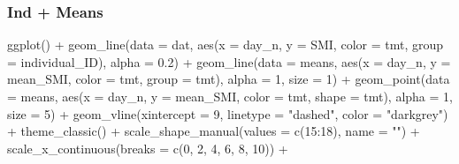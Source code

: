 \documentclass[
]{article}
\newenvironment{Shaded}{\begin{snugshade}}{\end{snugshade}}
\newcommand{\AttributeTok}[1]{\textcolor[rgb]{0.77,0.63,0.00}{#1}}
\newcommand{\DecValTok}[1]{\textcolor[rgb]{0.00,0.00,0.81}{#1}}
\newcommand{\FloatTok}[1]{\textcolor[rgb]{0.00,0.00,0.81}{#1}}
\newcommand{\FunctionTok}[1]{\textcolor[rgb]{0.00,0.00,0.00}{#1}}
\newcommand{\NormalTok}[1]{#1}
\newcommand{\SpecialCharTok}[1]{\textcolor[rgb]{0.00,0.00,0.00}{#1}}
\newcommand{\StringTok}[1]{\textcolor[rgb]{0.31,0.60,0.02}{#1}}
\begin{document}
\hypertarget{ind-means}{%
\subsubsection{Ind + Means}\label{ind-means}}

\begin{Shaded}
\begin{Highlighting}[]
\FunctionTok{ggplot}\NormalTok{() }\SpecialCharTok{+} 
  \FunctionTok{geom\_line}\NormalTok{(}\AttributeTok{data =}\NormalTok{ dat,}
            \FunctionTok{aes}\NormalTok{(}\AttributeTok{x =}\NormalTok{ day\_n,}
                \AttributeTok{y =}\NormalTok{ SMI, }
                \AttributeTok{color =}\NormalTok{ tmt,}
                \AttributeTok{group =}\NormalTok{ individual\_ID),}
            \AttributeTok{alpha =} \FloatTok{0.2}\NormalTok{) }\SpecialCharTok{+}
  \FunctionTok{geom\_line}\NormalTok{(}\AttributeTok{data =}\NormalTok{ means,}
            \FunctionTok{aes}\NormalTok{(}\AttributeTok{x =}\NormalTok{ day\_n,}
                \AttributeTok{y =}\NormalTok{ mean\_SMI, }
                \AttributeTok{color =}\NormalTok{ tmt,}
                \AttributeTok{group =}\NormalTok{ tmt),}
            \AttributeTok{alpha =} \DecValTok{1}\NormalTok{, }
            \AttributeTok{size =} \DecValTok{1}\NormalTok{) }\SpecialCharTok{+}
  \FunctionTok{geom\_point}\NormalTok{(}\AttributeTok{data =}\NormalTok{ means,}
            \FunctionTok{aes}\NormalTok{(}\AttributeTok{x =}\NormalTok{ day\_n,}
                \AttributeTok{y =}\NormalTok{ mean\_SMI, }
                \AttributeTok{color =}\NormalTok{ tmt,}
                \AttributeTok{shape =}\NormalTok{ tmt),}
            \AttributeTok{alpha =} \DecValTok{1}\NormalTok{, }
            \AttributeTok{size =} \DecValTok{5}\NormalTok{) }\SpecialCharTok{+}
  \FunctionTok{geom\_vline}\NormalTok{(}\AttributeTok{xintercept =} \DecValTok{9}\NormalTok{,}
             \AttributeTok{linetype =} \StringTok{"dashed"}\NormalTok{,}
             \AttributeTok{color =} \StringTok{"darkgrey"}\NormalTok{) }\SpecialCharTok{+}
  \FunctionTok{theme\_classic}\NormalTok{() }\SpecialCharTok{+} 
  \FunctionTok{scale\_shape\_manual}\NormalTok{(}\AttributeTok{values =} \FunctionTok{c}\NormalTok{(}\DecValTok{15}\SpecialCharTok{:}\DecValTok{18}\NormalTok{), }\AttributeTok{name =} \StringTok{""}\NormalTok{) }\SpecialCharTok{+}
  \FunctionTok{scale\_x\_continuous}\NormalTok{(}\AttributeTok{breaks =} \FunctionTok{c}\NormalTok{(}\DecValTok{0}\NormalTok{, }\DecValTok{2}\NormalTok{, }\DecValTok{4}\NormalTok{, }\DecValTok{6}\NormalTok{, }\DecValTok{8}\NormalTok{, }\DecValTok{10}\NormalTok{)) }\SpecialCharTok{+}

\end{Highlighting}
\end{Shaded}
\end{document}
